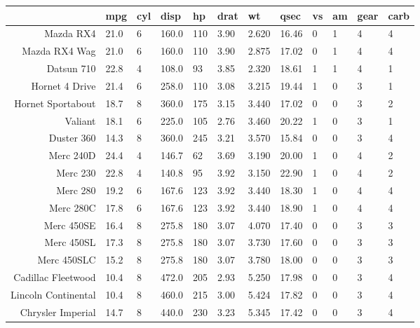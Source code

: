 \documentclass[11pt]{article}
\begin{document}
    \begin{tabular}{r|lllllllllll}
  & mpg & cyl & disp & hp & drat & wt & qsec & vs & am & gear & carb\\
\hline
	Mazda RX4 & 21.0  & 6     & 160.0 & 110   & 3.90  & 2.620 & 16.46 & 0     & 1     & 4     & 4    \\
	Mazda RX4 Wag & 21.0  & 6     & 160.0 & 110   & 3.90  & 2.875 & 17.02 & 0     & 1     & 4     & 4    \\
	Datsun 710 & 22.8  & 4     & 108.0 &  93   & 3.85  & 2.320 & 18.61 & 1     & 1     & 4     & 1    \\
	Hornet 4 Drive & 21.4  & 6     & 258.0 & 110   & 3.08  & 3.215 & 19.44 & 1     & 0     & 3     & 1    \\
	Hornet Sportabout & 18.7  & 8     & 360.0 & 175   & 3.15  & 3.440 & 17.02 & 0     & 0     & 3     & 2    \\
	Valiant & 18.1  & 6     & 225.0 & 105   & 2.76  & 3.460 & 20.22 & 1     & 0     & 3     & 1    \\
	Duster 360 & 14.3  & 8     & 360.0 & 245   & 3.21  & 3.570 & 15.84 & 0     & 0     & 3     & 4    \\
	Merc 240D & 24.4  & 4     & 146.7 &  62   & 3.69  & 3.190 & 20.00 & 1     & 0     & 4     & 2    \\
	Merc 230 & 22.8  & 4     & 140.8 &  95   & 3.92  & 3.150 & 22.90 & 1     & 0     & 4     & 2    \\
	Merc 280 & 19.2  & 6     & 167.6 & 123   & 3.92  & 3.440 & 18.30 & 1     & 0     & 4     & 4    \\
	Merc 280C & 17.8  & 6     & 167.6 & 123   & 3.92  & 3.440 & 18.90 & 1     & 0     & 4     & 4    \\
	Merc 450SE & 16.4  & 8     & 275.8 & 180   & 3.07  & 4.070 & 17.40 & 0     & 0     & 3     & 3    \\
	Merc 450SL & 17.3  & 8     & 275.8 & 180   & 3.07  & 3.730 & 17.60 & 0     & 0     & 3     & 3    \\
	Merc 450SLC & 15.2  & 8     & 275.8 & 180   & 3.07  & 3.780 & 18.00 & 0     & 0     & 3     & 3    \\
	Cadillac Fleetwood & 10.4  & 8     & 472.0 & 205   & 2.93  & 5.250 & 17.98 & 0     & 0     & 3     & 4    \\
	Lincoln Continental & 10.4  & 8     & 460.0 & 215   & 3.00  & 5.424 & 17.82 & 0     & 0     & 3     & 4    \\
	Chrysler Imperial & 14.7  & 8     & 440.0 & 230   & 3.23  & 5.345 & 17.42 & 0     & 0     & 3     & 4    \\

\end{tabular}
\end{document}

